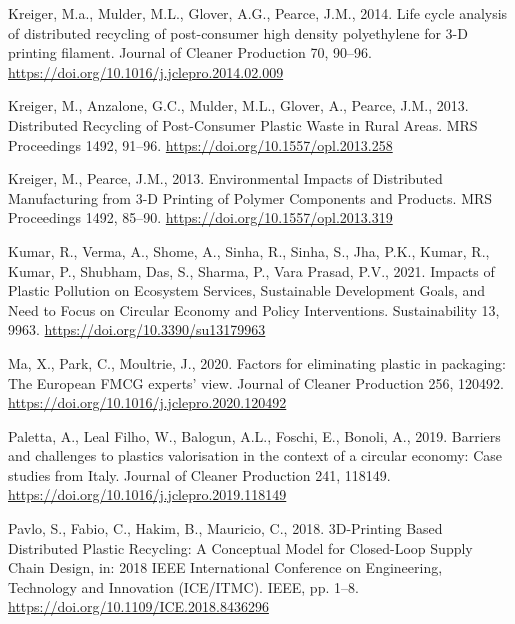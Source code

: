 \documentclass[]{elsarticle} %
\newlength{\cslhangindent}
\newlength{\cslentryspacingunit} %
\newenvironment{CSLReferences}[2] %
 {%
  \setlength{\parindent}{0pt}
  \ifodd #1
  \let\oldpar\par
  \def\par{\hangindent=\cslhangindent\oldpar}
  \fi
  \setlength{\parskip}{#2\cslentryspacingunit}
 }%
 {}
\begin{document}
\begin{CSLReferences}{1}{0}
\leavevmode{}%
Kreiger, M.a., Mulder, M.L., Glover, A.G., Pearce, J.M., 2014. Life cycle analysis of distributed recycling of post-consumer high density polyethylene for 3-{D} printing filament. Journal of Cleaner Production 70, 90--96. \url{https://doi.org/10.1016/j.jclepro.2014.02.009}

\leavevmode{}%
Kreiger, M., Anzalone, G.C., Mulder, M.L., Glover, A., Pearce, J.M., 2013. Distributed {Recycling} of {Post-Consumer Plastic Waste} in {Rural Areas}. MRS Proceedings 1492, 91--96. \url{https://doi.org/10.1557/opl.2013.258}

\leavevmode{}%
Kreiger, M., Pearce, J.M., 2013. Environmental {Impacts} of {Distributed Manufacturing} from 3-{D Printing} of {Polymer Components} and {Products}. MRS Proceedings 1492, 85--90. \url{https://doi.org/10.1557/opl.2013.319}

\leavevmode{}%
Kumar, R., Verma, A., Shome, A., Sinha, R., Sinha, S., Jha, P.K., Kumar, R., Kumar, P., Shubham, Das, S., Sharma, P., Vara Prasad, P.V., 2021. Impacts of {Plastic Pollution} on {Ecosystem Services}, {Sustainable Development Goals}, and {Need} to {Focus} on {Circular Economy} and {Policy Interventions}. Sustainability 13, 9963. \url{https://doi.org/10.3390/su13179963}

\leavevmode{}%
Ma, X., Park, C., Moultrie, J., 2020. Factors for eliminating plastic in packaging: {The European FMCG} experts' view. Journal of Cleaner Production 256, 120492. \url{https://doi.org/10.1016/j.jclepro.2020.120492}

\leavevmode{}%
Paletta, A., Leal Filho, W., Balogun, A.L., Foschi, E., Bonoli, A., 2019. Barriers and challenges to plastics valorisation in the context of a circular economy: {Case} studies from {Italy}. Journal of Cleaner Production 241, 118149. \url{https://doi.org/10.1016/j.jclepro.2019.118149}

\leavevmode{}%
Pavlo, S., Fabio, C., Hakim, B., Mauricio, C., 2018. {3D-Printing Based Distributed Plastic Recycling}: {A Conceptual Model} for {Closed-Loop Supply Chain Design}, in: 2018 {IEEE International Conference} on {Engineering}, {Technology} and {Innovation} ({ICE}/{ITMC}). {IEEE}, pp. 1--8. \url{https://doi.org/10.1109/ICE.2018.8436296}


\end{CSLReferences}
\end{document}
